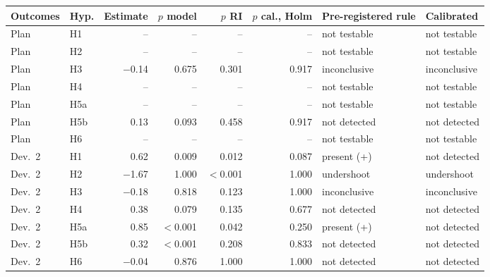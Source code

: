 \begin{tabular}{llrrrrll}
\toprule
Outcomes & Hyp. & Estimate & $p$ model & $p$ RI & $p$ cal., Holm & Pre-registered rule & Calibrated \\
\midrule
Plan & H1 & -- & -- & -- & -- & not testable & not testable \\
Plan & H2 & -- & -- & -- & -- & not testable & not testable \\
Plan & H3 & $-$0.14 & 0.675 & 0.301 & 0.917 & inconclusive & inconclusive \\
Plan & H4 & -- & -- & -- & -- & not testable & not testable \\
Plan & H5a & -- & -- & -- & -- & not testable & not testable \\
Plan & H5b & 0.13 & 0.093 & 0.458 & 0.917 & not detected & not detected \\
Plan & H6 & -- & -- & -- & -- & not testable & not testable \\
\midrule
Dev.~2 & H1 & 0.62 & 0.009 & 0.012 & 0.087 & present (+) & not detected \\
Dev.~2 & H2 & $-$1.67 & 1.000 & $<$0.001 & 1.000 & undershoot & undershoot \\
Dev.~2 & H3 & $-$0.18 & 0.818 & 0.123 & 1.000 & inconclusive & inconclusive \\
Dev.~2 & H4 & 0.38 & 0.079 & 0.135 & 0.677 & not detected & not detected \\
Dev.~2 & H5a & 0.85 & $<$0.001 & 0.042 & 0.250 & present (+) & not detected \\
Dev.~2 & H5b & 0.32 & $<$0.001 & 0.208 & 0.833 & not detected & not detected \\
Dev.~2 & H6 & $-$0.04 & 0.876 & 1.000 & 1.000 & not detected & not detected \\
\bottomrule
\end{tabular}
